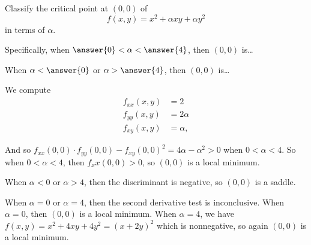 \documentclass{ximera}
\author{Jim Fowler}
\begin{document}
\begin{exercise}

Classify the critical point at $(0,0)$ of
$$
f(x,y) = x^2 + \alpha x y + \alpha y^2
$$
in terms of $\alpha$.

Specifically, when $\answer{0} < \alpha< \answer{4}$, then $(0,0)$ is\ldots
\begin{multipleChoice}
\end{multipleChoice}

When $\alpha < \answer{0}$ or $\alpha > \answer{4}$, then $(0,0)$ is\ldots
\begin{multipleChoice}
\end{multipleChoice}

\begin{hint}
We compute 
\begin{align*}
  f_{xx}(x,y) &= 2 \\
  f_{yy}(x,y) &= 2 \alpha \\
  f_{xy}(x,y) &= \alpha,
\end{align*}
\end{hint}
\begin{hint}
And so $f_{xx}(0,0) \cdot f_{yy}(0,0) - f_{xy}(0,0)^2 = 4 \alpha - \alpha^2 > 0$ when $0 < \alpha 
< 4$.  So when $0 < \alpha< 4$, then $f_xx(0,0) > 0$, so $(0,0)$ is a local minimum.
\end{hint}

\begin{hint}
When $\alpha < 0$ or $\alpha > 4$, then the discriminant is negative, so $(0,0)$ is a saddle.
\end{hint}

\begin{hint}
When $\alpha = 0$ or $\alpha = 4$, then the second derivative test is inconclusive.  When $\alpha = 0$, then $(0,0)$ is a local minimum.  When $\alpha = 4$, we have $f(x,y) = x^2 + 4xy + 4y^2 = (x + 2y)^2$ which is nonnegative, so again $(0,0)$ is a local minimum.
\end{hint}

\end{exercise}
\end{document}
